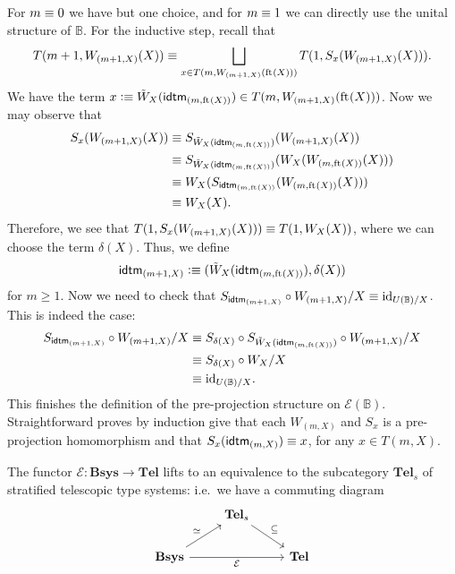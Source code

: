 \begin{constr}
For $m\equiv 0$ we have but one
choice, and for $m\equiv 1$ we can directly use the unital structure of
$\mathbb{B}$. For the inductive step, recall that
\begin{equation*}
T(m+1,W_{(m+1,X)}(X))\equiv\bigsqcup_{x\in T(m,W_{(m+1,X)}(\mathrm{ft}_{}(X)))}T(1,S_x(W_{(m+1,X)}(X))).
\end{equation*}
We have the term $x\defeq \tilde{W}_X(\tfid{(m,\eft(X))})\in T(m,W_{(m+1,X)}(\eft(X)))$.
Now we may observe that 
\begin{align*}
S_x(W_{(m+1,X)}(X))
  & \jdeq 
S_{\tilde{W}_X(\tfid{(m,\eft(X))})}(W_{(m+1,X)}(X))\\
  & \jdeq 
S_{\tilde{W}_X(\tfid{(m,\eft(X))})}(W_X(W_{(m,\eft(X))}(X))) \\
  & \jdeq
W_{X}(S_{\tfid{(m,\eft(X))}}(W_{(m,\eft(X))}(X))) \\
  & \jdeq 
W_{X}(X).
\end{align*}
Therefore, we see that $T(1,S_x(W_{(m+1,X)}(X)))\equiv T(1,W_X(X))$, where we can
choose the term $\delta(X)$. Thus, we define
\begin{equation*}
\tfid{(m+1,X)}\defeq (\tilde{W}_X(\tfid{(m,\eft(X))}),\delta(X))
\end{equation*} 
for $m\geq 1$. Now we need to check that $S_{\tfid{(m+1,X)}}\circ 
W_{(m+1,X)}/X\jdeq \catid{U(\mathbb{B})/X}$. This is indeed the case:
\begin{align*}
S_{\tfid{(m+1,X)}}\circ W_{(m+1,X)}/X
  & \jdeq
S_{\delta(X)}\circ S_{\tilde{W}_X(\tfid{(m,\eft(X))})}\circ W_{(m+1,X)}/X \\
  & \jdeq
S_{\delta(X)}\circ W_X/X \\
  & \jdeq
\catid{U(\mathbb{B})/X}.
\end{align*}
This finishes the definition of the pre-projection structure on $\mathcal{E}(\mathbb{B})$.
Straightforward proves by induction give that each $W_{(m,X)}$ and $S_x$ is a 
pre-projection homomorphism and that $S_x(\tfid{(m,X)})\jdeq x$, for any 
$x\in T(m,X)$.
\end{constr}

\begin{thm}
The functor $\mathcal{E}:\mathbf{Bsys}\to\mathbf{Tel}$ lifts to an equivalence
to the subcategory $\mathbf{Tel}_s$ of stratified telescopic type systems: i.e.~we have a
commuting diagram
\begin{equation*}
\begin{tikzcd}
& \mathbf{Tel}_s \arrow[dr,"\subseteq"]\\
\mathbf{Bsys} \arrow[ur,"\simeq"] \arrow[rr,swap,"\mathcal{E}"] & & \mathbf{Tel}
\end{tikzcd}
\end{equation*}
\end{thm}

